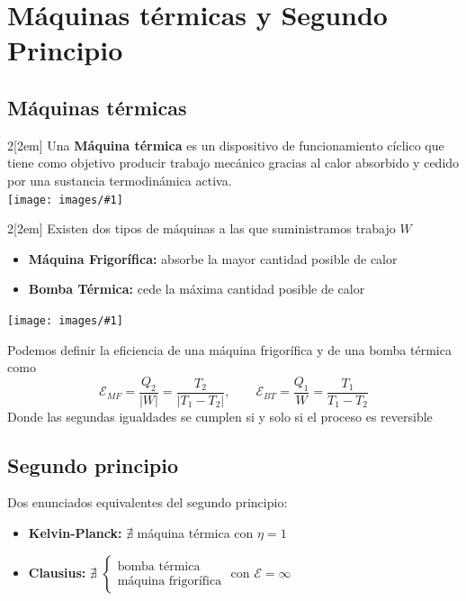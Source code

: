 \documentclass{myclass}
\newcommand{\incimg}[1]{%
    \texttt{[image: images/\#1]}
}
\begin{document}
\section{Máquinas térmicas y Segundo Principio}
\subsection{Máquinas térmicas}
\begin{multicols}{2}[\columnsep2em]
Una \textbf{Máquina térmica} es un dispositivo de funcionamiento cíclico que tiene como objetivo producir trabajo mecánico gracias al calor absorbido y cedido por una sustancia termodinámica activa. \\
\columnbreak
\incimg{MaquinaTermica.png}
\end{multicols}
\begin{multicols}{2}[\columnsep2em]
  Existen dos tipos de máquinas a las que suministramos trabajo $W$
\begin{itemize}
  \item \textbf{Máquina Frigorífica:} absorbe la mayor cantidad posible de calor
  \item \textbf{Bomba Térmica:} cede la máxima cantidad posible de calor 
\end{itemize}
\columnbreak
\incimg{MaquinaFrigorifica.png}
\end{multicols}
Podemos definir la eficiencia de una máquina frigorífica y de una bomba térmica como
\[
\mathcal{E}_{MF} = \frac{Q_2}{|W|} = \frac{T_2}{|T_1- T_2|}, \qquad \mathcal{E}_{BT} = \frac{Q_1}{W} = \frac{T_1}{T_1- T_2}
\]
Donde las segundas igualdades se cumplen si y solo si el proceso es reversible

\subsection{Segundo principio}
Dos enunciados equivalentes del segundo principio:
\begin{itemize}
    \item \textbf{Kelvin-Planck:} $\nexists$ máquina térmica con $\eta = 1$
    \item \textbf{Clausius:} $\nexists$ $\begin{cases}
    \text{bomba térmica} \\
    \text{máquina frigorífica}
    \end{cases}$ con $\mathcal{E}= \infty$
\end{itemize}
\end{document}
